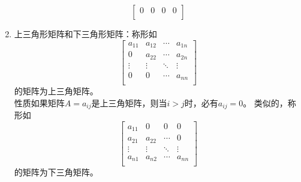 \begin{enumerate}
{$$         \left[ \begin{matrix}
            0 & 0 & 0 & 0  \\
         \end{matrix} \right]         
        $$
    }
    \item{
        上三角形矩阵和下三角形矩阵：称形如
        $$
        \left[ \begin{matrix}
            {{a}_{11}} & {{a}_{12}} & \cdots  & {{a}_{1n}}  \\
            0 & {{a}_{22}} & \cdots  & {{a}_{2n}}  \\
            \vdots  & \vdots  & {\ddots} & \vdots   \\
            0 & 0 & \cdots  & {{a}_{nn}}  \\
         \end{matrix} \right]         
        $$
        的矩阵为上三角矩阵。\\
        {\color{blue}性质\quad}如果矩阵$A={a_{ij}}$是上三角矩阵，则当$i>j$时，必有$a_{ij}=0$。
        类似的，称形如
         $$
         \left[ \begin{matrix}
            {{a}_{11}} & 0 & 0 & 0  \\
            {{a}_{21}} & {{a}_{22}} & \cdots  & 0  \\
            \vdots  & \vdots  & {\ddots} & \vdots   \\
            {{a}_{n1}} & {{a}_{n2}} & \cdots  & {{a}_{nn}}  \\
         \end{matrix} \right]         
         $$
        的矩阵为下三角矩阵。
    }
\end{enumerate}